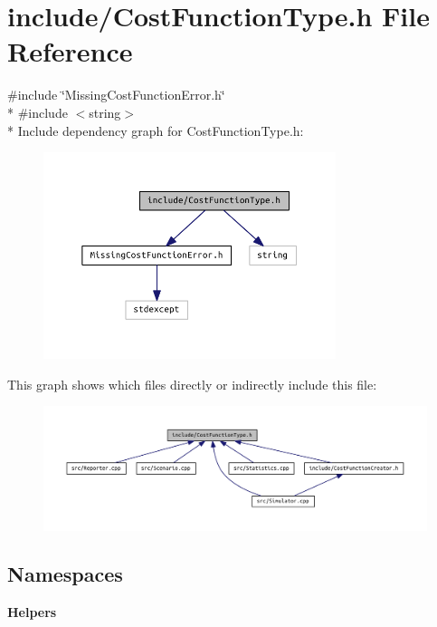 \section{include/\+Cost\+Function\+Type.h File Reference}
\label{_cost_function_type_8h}
{\ttfamily \#include \char`\"{}Missing\+Cost\+Function\+Error.\+h\char`\"{}}\\*
{\ttfamily \#include $<$string$>$}\\*
Include dependency graph for Cost\+Function\+Type.\+h\+:
\nopagebreak
\begin{figure}[H]
\begin{center}
\leavevmode
\includegraphics[width=242pt]{_cost_function_type_8h__incl}
\end{center}
\end{figure}
This graph shows which files directly or indirectly include this file\+:
\nopagebreak
\begin{figure}[H]
\begin{center}
\leavevmode
\includegraphics[width=350pt]{_cost_function_type_8h__dep__incl}
\end{center}
\end{figure}
\subsection*{Namespaces}
\begin{DoxyCompactItemize}
\item 
 {\bf Helpers}
\end{DoxyCompactItemize}
